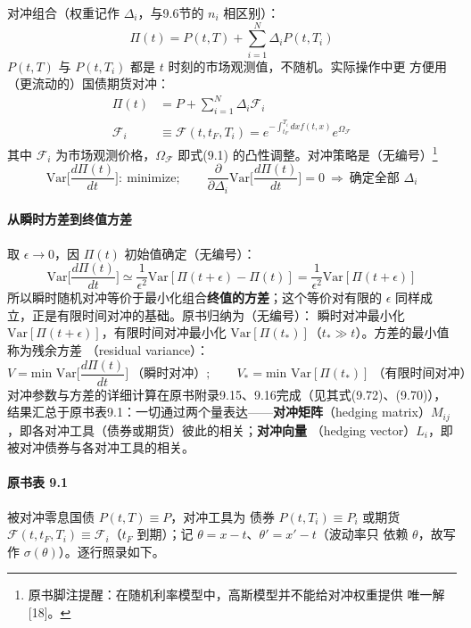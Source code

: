 对冲组合（权重记作 $\Delta_i$，与9.6节的 $n_i$ 相区别）：
\begin{equation*}
\Pi(t)=P(t,T)+\sum_{i=1}^{N}\Delta_iP(t,T_i)\tag{9.35}
\end{equation*}
$P(t,T)$ 与 $P(t,T_i)$ 都是 $t$ 时刻的市场观测值，不随机。实际操作中更
方便用（更流动的）国债期货对冲：
\begin{align*}
\Pi(t)&=P+\sum_{i=1}^{N}\Delta_i\mathcal{F}_i\\
\mathcal{F}_i&\equiv\mathcal{F}(t,t_F,T_i)
=e^{-\int_{t_F}^{T_i}dxf(t,x)}e^{\Omega_{\mathcal{F}}}
\tag{9.36}\end{align*}
其中 $\mathcal{F}_i$ 为市场观测价格，$\Omega_{\mathcal{F}}$ 即式(9.1)
的凸性调整。对冲策略是（无编号）\footnote{原书脚注提醒：在随机利率模型中，高斯模型并不能给对冲权重提供
唯一解 [18]。}
\begin{equation*}
\mathrm{Var}\biggl[\frac{d\Pi(t)}{dt}\biggr]:\ \text{minimize};\qquad
\frac{\partial}{\partial\Delta_i}\mathrm{Var}\biggl[
\frac{d\Pi(t)}{dt}\biggr]=0\ \Rightarrow\ \text{确定全部 }\Delta_i
\end{equation*}
\paragraph{从瞬时方差到终值方差}
取 $\epsilon\to0$，因 $\Pi(t)$ 初始值确定（无编号）：
\begin{equation*}
\mathrm{Var}\biggl[\frac{d\Pi(t)}{dt}\biggr]\simeq
\frac{1}{\epsilon^{2}}\mathrm{Var}[\Pi(t+\epsilon)-\Pi(t)]
=\frac{1}{\epsilon^{2}}\mathrm{Var}[\Pi(t+\epsilon)]
\end{equation*}
所以瞬时随机对冲等价于最小化组合\textbf{终值的方差}；这个等价对有限的
$\epsilon$ 同样成立，正是有限时间对冲的基础。原书归纳为（无编号）：
瞬时对冲最小化 $\mathrm{Var}[\Pi(t+\epsilon)]$，有限时间对冲最小化
$\mathrm{Var}[\Pi(t_*)]$（$t_*\gg t$）。方差的最小值称为残余方差
（residual variance）：
\begin{equation*}
V=\text{min Var}\biggl[\frac{d\Pi(t)}{dt}\biggr]\ \text{（瞬时对冲）};\qquad
V_{*}=\text{min Var}[\Pi(t_{*})]\ \text{（有限时间对冲）}
\end{equation*}
对冲参数与方差的详细计算在原书附录9.15、9.16完成（见其式(9.72)、(9.70)），
结果汇总于原书表9.1：一切通过两个量表达——\textbf{对冲矩阵}（hedging
matrix）$M_{ij}$，即各对冲工具（债券或期货）彼此的相关；\textbf{对冲向量}
（hedging vector）$L_i$，即被对冲债券与各对冲工具的相关。

\paragraph{原书表 9.1}\quad 被对冲零息国债 $P(t,T)\equiv P$，对冲工具为
债券 $P(t,T_i)\equiv P_i$ 或期货 $\mathcal{F}(t,t_F,T_i)\equiv
\mathcal{F}_i$（$t_F$ 到期）；记 $\theta=x-t$、$\theta'=x'-t$（波动率只
依赖 $\theta$，故写作 $\sigma(\theta)$）。逐行照录如下。

